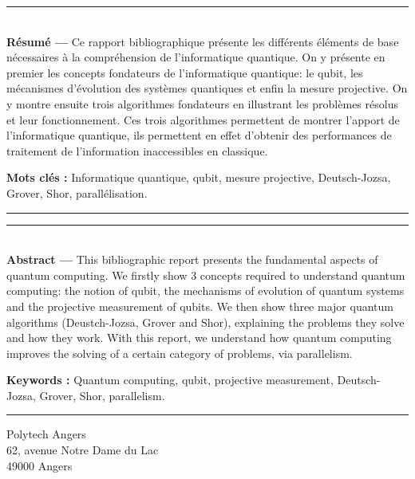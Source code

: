 \documentclass[12pt,a4paper]{report}
\begin{document}
\clearpage
{}



\clearpage
\thispagestyle{empty}

\vspace*{\fill}
\noindent\rule[2pt]{\textwidth}{0.5pt}\\
{\textbf{Résumé ---}}
Ce rapport bibliographique présente les différents éléments de base nécessaires à la compréhension de l'informatique quantique. On y présente en premier les concepts fondateurs de l'informatique quantique: le qubit, les mécanismes d'évolution des systèmes quantiques et enfin la mesure projective. On y montre ensuite trois algorithmes fondateurs en illustrant les problèmes résolus et leur fonctionnement. Ces trois algorithmes permettent de montrer l'apport de l'informatique quantique, ils permettent en effet d'obtenir des performances de traitement de l'information inaccessibles en classique.

{\textbf{Mots clés :}}
Informatique quantique, qubit, mesure projective, Deutsch-Jozsa, Grover, Shor, parallélisation.
\\
\noindent\rule[2pt]{\textwidth}{0.5pt}


\vspace*{\fill}
\noindent\rule[2pt]{\textwidth}{0.5pt}\\
{\textbf{Abstract ---}}
This bibliographic report presents the fundamental aspects of quantum computing. We firstly show 3 concepts required to understand quantum computing: the notion of qubit, the mechanisms of evolution of quantum systems and the projective measurement of qubits. We then show three major quantum algorithms (Deustch-Jozsa, Grover and Shor), explaining the problems they solve and how they work. With this report, we understand how quantum computing improves the solving of a certain category of problems, via parallelism. 

{\textbf{Keywords :}}
Quantum computing, qubit, projective measurement, Deutsch-Jozsa, Grover, Shor, parallelism.
\\
\noindent\rule[2pt]{\textwidth}{0.5pt}

\begin{center}
  Polytech Angers\\
  62, avenue Notre Dame du Lac\\
  49000 Angers
\end{center}
\vspace*{\fill}
\end{document}

